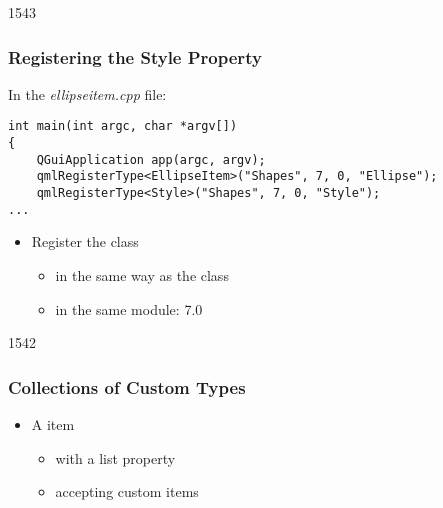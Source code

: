 \begin{slide}[fragile]{1543}\frametitle{Registering the Style Property}

In the \textit{ellipseitem.cpp} file:

\vspace*{0.5em}
\begin{lstlisting}
int main(int argc, char *argv[])
{
    QGuiApplication app(argc, argv);
    qmlRegisterType<EllipseItem>("Shapes", 7, 0, "Ellipse");
    qmlRegisterType<Style>("Shapes", 7, 0, "Style");
...
\end{lstlisting}

\vspace*{1.0em}
\begin{itemize}
\item Register the  class
  \begin{itemize}
  \item in the same way as the  class
  \item in the same module:  7.0
  \end{itemize}
\end{itemize}

\end{slide}

\begin{slide}[fragile]{1542}\frametitle{Collections of Custom Types}


\begin{itemize}
\item A  item
  \begin{itemize}
  \item with a  list property
  \item accepting custom  items
  \end{itemize}
\end{itemize}

\end{slide}

